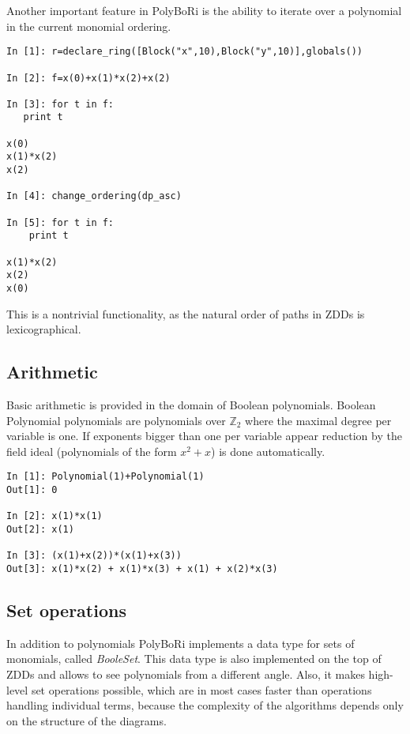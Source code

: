 \documentclass[]{article}
\newcommand{\PolyBoRi}{{\sc PolyBoRi}\xspace}
\newcommand{\functionname}[1]{\textit{#1}\xspace}
\newcommand{\Ztwo}{\mathbb{Z}_2}
\newcounter{thm}
\begin{document}
Another important feature in \PolyBoRi is the ability to iterate over a polynomial in the current monomial ordering.

\begin{verbatim}
In [1]: r=declare_ring([Block("x",10),Block("y",10)],globals())

In [2]: f=x(0)+x(1)*x(2)+x(2)

In [3]: for t in f:
   print t
   
x(0)
x(1)*x(2)
x(2)

In [4]: change_ordering(dp_asc)

In [5]: for t in f:
    print t

x(1)*x(2)
x(2)
x(0)
\end{verbatim}
%
This is a nontrivial functionality, as the natural order of paths in ZDDs is lexicographical.


\subsection{Arithmetic}
Basic arithmetic is provided in the domain of Boolean polynomials. Boolean Polynomial polynomials are polynomials over $\Ztwo$ where the maximal degree per variable is one.
If exponents bigger than one per variable appear reduction by the field ideal (polynomials of the form $x^2+x$) is done automatically.
\begin{verbatim}
In [1]: Polynomial(1)+Polynomial(1)
Out[1]: 0

In [2]: x(1)*x(1)
Out[2]: x(1)

In [3]: (x(1)+x(2))*(x(1)+x(3))
Out[3]: x(1)*x(2) + x(1)*x(3) + x(1) + x(2)*x(3)
\end{verbatim}

\subsection{Set operations}
In addition to polynomials  \PolyBoRi implements a data type for sets of monomials, called \functionname{BooleSet}.
This data type is also implemented on the top of ZDDs and allows to see
polynomials
from a different angle. Also, it makes high-level set operations possible, which are in most cases faster than operations handling individual terms, because the complexity of the algorithms depends only on the structure of the diagrams.
\end{document}
